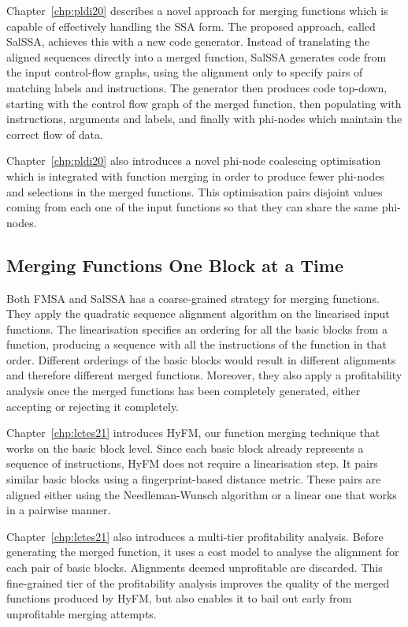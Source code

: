Chapter~\ref{chp:pldi20} describes a novel approach for merging functions which is capable of effectively handling the SSA form.
The proposed approach, called SalSSA, achieves this with a new code generator.
Instead of translating the aligned sequences directly into a merged function, SalSSA generates code from the input control-flow graphs, using the alignment only to specify pairs of matching labels and instructions.
The generator then produces code top-down, starting with the control flow graph of the merged function, then populating with instructions, arguments and labels, and finally with phi-nodes which maintain the correct flow of data.

Chapter~\ref{chp:pldi20} also introduces a novel phi-node coalescing optimisation which is integrated with function merging in order to produce fewer phi-nodes and selections in the merged functions.
This optimisation pairs disjoint values coming from each one of the input functions so that they can share the same phi-nodes.

\subsection{Merging Functions One Block at a Time}

Both FMSA and SalSSA has a coarse-grained strategy for merging functions.
They apply the quadratic sequence alignment algorithm on the linearised input functions.
The linearisation specifies an ordering for all the basic blocks from a function, producing a sequence with all the instructions of the function in that order.
Different orderings of the basic blocks would result in different alignments and therefore different merged functions.
Moreover, they also apply a profitability analysis once the merged functions has been completely generated, either accepting or rejecting it completely.

Chapter~\ref{chp:lctes21} introduces HyFM, our function merging technique that works on the basic block level.
Since each basic block already represents a sequence of instructions, HyFM does not require a linearisation step.
It pairs similar basic blocks using a fingerprint-based distance metric.
These pairs are aligned either using the Needleman-Wunsch algorithm or a linear one that works in a pairwise manner.

Chapter~\ref{chp:lctes21} also introduces a multi-tier profitability analysis.
Before generating the merged function, it uses a cost model to analyse the alignment for each pair of basic blocks.
Alignments deemed unprofitable are discarded.
This fine-grained tier of the profitability analysis improves the quality of the merged functions produced by HyFM, but also enables it to bail out early from unprofitable merging attempts.

